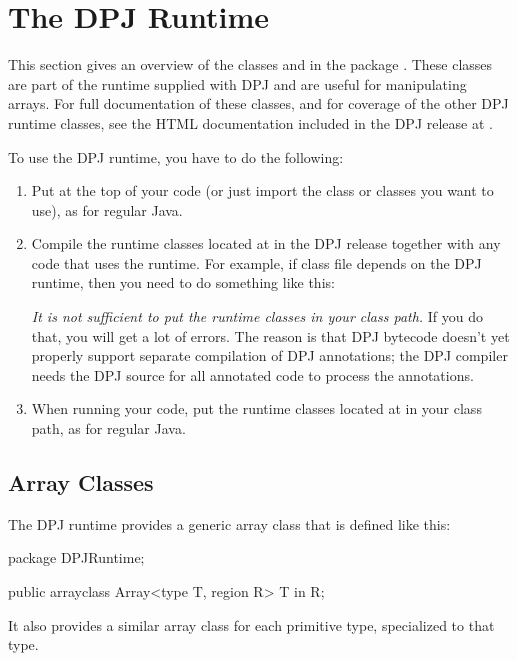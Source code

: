 \section{The DPJ Runtime%
\label{sec:runtime}}

This section gives an overview of the classes  and
 in the package .  These classes are
part of the runtime supplied with DPJ and are useful for manipulating
arrays.  For full documentation of these classes, and for coverage of
the other DPJ runtime classes, see the HTML documentation included in
the DPJ release at .

To use the DPJ runtime, you have to do the following:
%
\begin{enumerate}
%
\item Put  at the top of your code (or just
  import the class or classes you want to use), as for regular Java.
%
\item Compile the runtime classes located at
   in the DPJ release together with
  any code that uses the runtime.  For example, if class file
   depends on the DPJ runtime, then you need to do
  something like this:
%
%
\emph{It is not sufficient to put the runtime classes in your class
  path.}  If you do that, you will get a lot of errors.  The reason is
that DPJ bytecode doesn't yet properly support separate compilation of
DPJ annotations; the DPJ compiler needs the DPJ source for all
annotated code to process the annotations.
%
\item When running your code, put the runtime classes located at
   in your class path, as for
  regular Java.
%
\end{enumerate}

\subsection{Array Classes%
\label{sec:runtime:array}}

The DPJ runtime provides a generic array class  that is
defined like this:
%
\begin{dpjlisting}
package DPJRuntime;

public arrayclass Array<type T, region R> {
  T in R;
}
\end{dpjlisting}
%
It also provides a similar array class for each primitive type,
specialized to that type.

